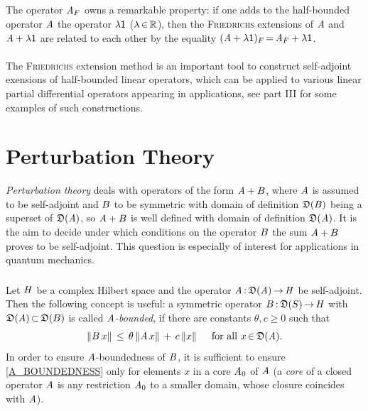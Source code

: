 \documentclass[11pt,twoside]{article}
\begin{document}
\subparagraph*{}
The operator $\mathit{A}_F$ owns a remarkable property:
if one adds to the half-bounded operator $\mathit{A}$
the operator $\lambda {\mathsf{1}}$ ($\lambda {\,\in\,} {\mathbb{R}}$),
then the \textsc{Friedrichs} extensions
of $\mathit{A}$ and $\mathit{A}+\lambda {\mathsf{1}}$ are related to each other
by the equality
$(\mathit{A} + \lambda {\mathsf{1}})_F {\,=\,} \mathit{A}_F + \lambda {\mathsf{1}}$.

\paragraph*{}
The \textsc{Friedrichs} extension method is an important tool
to construct self-adjoint exensions of half-bounded linear operators,
which can be applied to various linear partial differential operators
appearing in applications,
see part III for some examples of such constructions.

\section{Perturbation Theory}
\textit{Perturbation theory} deals with operators of the form $\mathit{A}+{B}$,
where $\mathit{A}$ is assumed to be self-adjoint and ${B}$ to be symmetric
with domain of definition $\mathfrak{D}({B})$ being a superset of $\mathfrak{D}(\mathit{A})$,
so $\mathit{A} + {B}$ is well defined with domain of definition $\mathfrak{D}(\mathit{A})$.
It is the aim to decide
under which conditions on the operator ${B}$
the sum $\mathit{A}+{B}$ proves to be self-adjoint.
This question is especially of interest for applications in quantum mechanics.

\subsubsection*{} %
Let $\mathit{H}$ be a complex Hilbert space and the operator
$\mathit{A} {\,:\,} \mathfrak{D}(\mathit{A}) {\,\to\,} \mathit{H}$ be self-adjoint.
Then the following concept is useful:
a symmetric operator ${B} {\,:\,} \mathfrak{D}({S}) {\,\to\,} \mathit{H}$
with $\mathfrak{D}(\mathit{A}) {\,\subset\,} \mathfrak{D}({B})$
is called $\mathit{A}$\textit{-bounded},
if there are constants $\theta, c \geq 0$ such that
\begin{equation}\label{A_BOUNDEDNESS}
\left\lVert {B} \,x \right\rVert \, \leq \, \theta \left\lVert \mathit{A} \,x \right\rVert \, + \, c \left\lVert x \right\rVert
\quad \mbox{ for all } x {\,\in\,} \mathfrak{D}(\mathit{A}).
\end{equation}
In order to ensure $\mathit{A}$-boundedness of ${B}$,
it is sufficient to ensure \eqref{A_BOUNDEDNESS}
only for elements $x$ in a core $\mathit{A}_0$ of $\mathit{A}$
(a \textit{core} of a closed operator $\mathit{A}$
is any restriction $\mathit{A}_0$ to a smaller domain,
whose closure coincides with $\mathit{A}$).
\end{document}
